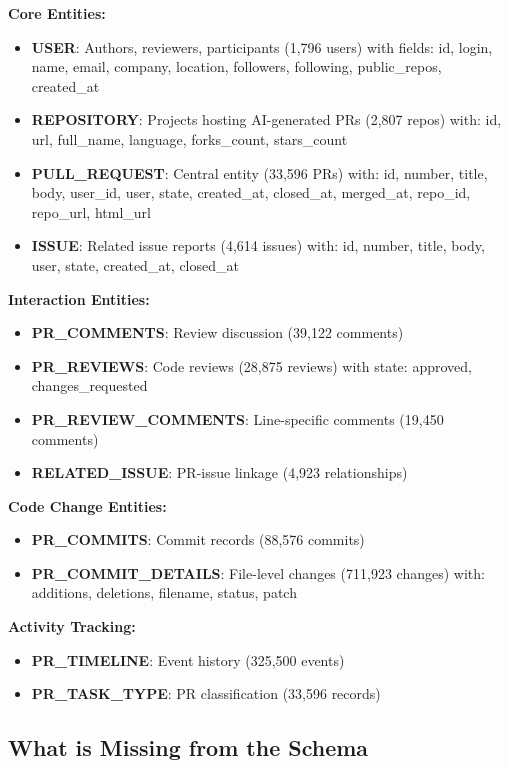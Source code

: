 \documentclass[11pt]{article}
\begin{document}
\textbf{Core Entities:}
\begin{itemize}
    \item \textbf{USER}: Authors, reviewers, participants (1,796 users) with fields: id, login, name, email, company, location, followers, following, public\_repos, created\_at
    \item \textbf{REPOSITORY}: Projects hosting AI-generated PRs (2,807 repos) with: id, url, full\_name, language, forks\_count, stars\_count
    \item \textbf{PULL\_REQUEST}: Central entity (33,596 PRs) with: id, number, title, body, user\_id, user, state, created\_at, closed\_at, merged\_at, repo\_id, repo\_url, html\_url
    \item \textbf{ISSUE}: Related issue reports (4,614 issues) with: id, number, title, body, user, state, created\_at, closed\_at
\end{itemize}

\textbf{Interaction Entities:}
\begin{itemize}
    \item \textbf{PR\_COMMENTS}: Review discussion (39,122 comments)
    \item \textbf{PR\_REVIEWS}: Code reviews (28,875 reviews) with state: approved, changes\_requested
    \item \textbf{PR\_REVIEW\_COMMENTS}: Line-specific comments (19,450 comments)
    \item \textbf{RELATED\_ISSUE}: PR-issue linkage (4,923 relationships)
\end{itemize}

\textbf{Code Change Entities:}
\begin{itemize}
    \item \textbf{PR\_COMMITS}: Commit records (88,576 commits)
    \item \textbf{PR\_COMMIT\_DETAILS}: File-level changes (711,923 changes) with: additions, deletions, filename, status, patch
\end{itemize}

\textbf{Activity Tracking:}
\begin{itemize}
    \item \textbf{PR\_TIMELINE}: Event history (325,500 events)
    \item \textbf{PR\_TASK\_TYPE}: PR classification (33,596 records)
\end{itemize}

\subsection{What is Missing from the Schema}
\end{document}
